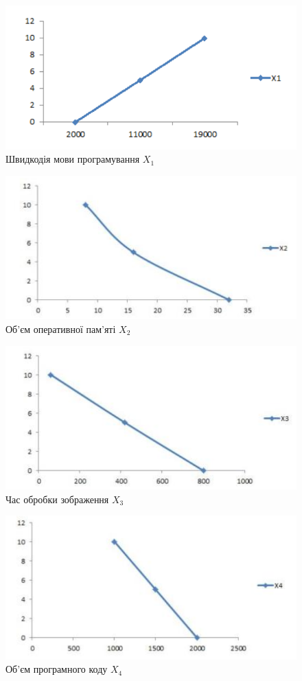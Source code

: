 \begin{figure}
	\centering
	\includegraphics[width=0.7\linewidth]{chapter_Economics/img/x1}
	\caption{Швидкодія мови програмування $X_1$}
	\label{fig:economics:x1}
\end{figure}
\begin{figure}
	\centering
	\includegraphics[width=0.7\linewidth]{chapter_Economics/img/x2}
	\caption{Об'єм оперативної пам'яті $X_2$}
	\label{fig:economics:x2}
\end{figure}
\begin{figure}
	\centering
	\includegraphics[width=0.7\linewidth]{chapter_Economics/img/x3}
	\caption{Час обробки зображення $X_3$}
	\label{fig:economics:x3}
\end{figure}
\begin{figure}
	\centering
	\includegraphics[width=0.7\linewidth]{chapter_Economics/img/x4}
	\caption{Об'єм програмного коду $X_4$}
	\label{fig:economics:x4}
\end{figure}

